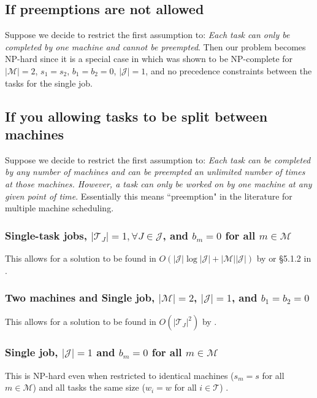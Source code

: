 \subsection{If preemptions are not allowed}
Suppose we decide to restrict the first assumption to: \emph{Each task can only be completed by one machine and cannot be preempted}.  Then our problem becomes NP-hard since it is a special case in \cite{lenstra1977complexity} which was shown to be NP-complete for $|\mathcal{M}|=2$, $s_1=s_2$, $b_1=b_2=0$, $|\mathcal{J}|=1$, and no precedence constraints between the tasks for the single job.

\subsection{If you allowing tasks to be split between machines}
Suppose we decide to restrict the first assumption to: \emph{Each task can be completed by any number of machines and can be preempted an unlimited number of times at those machines.  However, a task can only be worked on by one machine at any given point of time}.  Essentially this means ``preemption" in the literature for multiple machine scheduling.

\subsubsection{Single-task jobs, $|\mathcal{T}_J|=1,\forall J\in\mathcal{J}$, and $b_m=0$ for all $m\in\mathcal{M}$}
This allows for a solution to be found in $O(|\mathcal{J}|\log |\mathcal{J}| + |\mathcal{M}||\mathcal{J}|)$ by \cite{labetoulle1984preemptive} or \S 5.1.2 in \cite{brucker2007scheduling}.

\subsubsection{Two machines and Single job, $|\mathcal{M}|=2$, $|\mathcal{J}|=1$, and $b_1=b_2=0$}
This allows for a solution to be found in $O(|\mathcal{T}_J|^2)$ by \cite{lawler1982preemptive}.

\subsubsection{Single job, $|\mathcal{J}|=1$ and $b_m=0$ for all $m\in\mathcal{M}$}
This is NP-hard even when restricted to identical machines ($s_m=s$ for all $m\in\mathcal{M}$) and all tasks the same size ($w_i=w$ for all $i\in\mathcal{T}$) \cite{ullman1976complexity}.

